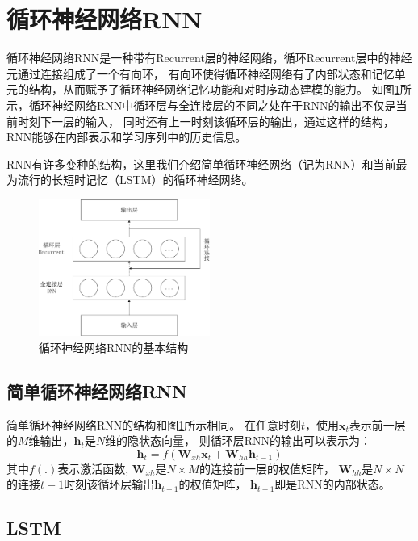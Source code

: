 \section{循环神经网络RNN}

循环神经网络RNN是一种带有Recurrent层的神经网络，循环Recurrent层中的神经元通过连接组成了一个有向环，
有向环使得循环神经网络有了内部状态和记忆单元的结构，从而赋予了循环神经网络记忆功能和对时序动态建模的能力。
如图\ref{fig:rnn}所示，循环神经网络RNN中循环层与全连接层的不同之处在于RNN的输出不仅是当前时刻下一层的输入，
同时还有上一时刻该循环层的输出，通过这样的结构，RNN能够在内部表示和学习序列中的历史信息。

RNN有许多变种的结构，这里我们介绍简单循环神经网络（记为RNN）和当前最为流行的长短时记忆（LSTM）的循环神经网络。


\begin{figure}
\centering
\includegraphics[width=0.5\textwidth]{figures/chapter3/rnn-crop}
\caption{循环神经网络RNN的基本结构}
\label{fig:rnn}
\end{figure}

\subsection{简单循环神经网络RNN}

简单循环神经网络RNN的结构和图\ref{fig:rnn}所示相同。
在任意时刻$t$，使用$\textbf{x}_t$表示前一层的$M$维输出，$\textbf{h}_t$是$N$维的隐状态向量，
则循环层RNN的输出可以表示为：
\begin{equation}
\textbf{h}_t = f({\textbf{W}_{xh}}{\textbf{x}_t} + {\textbf{W}_{hh}}{\textbf{h}_{t-1}})
\end{equation}
其中$f(.)$表示激活函数, $\textbf{W}_{xh}$是$N \times M$的连接前一层的权值矩阵，
$\textbf{W}_{hh}$是$N \times N$的连接$t-1$时刻该循环层输出$\textbf{h}_{t-1}$的权值矩阵，
$\textbf{h}_{t-1}$即是RNN的内部状态。

\subsection{LSTM}

